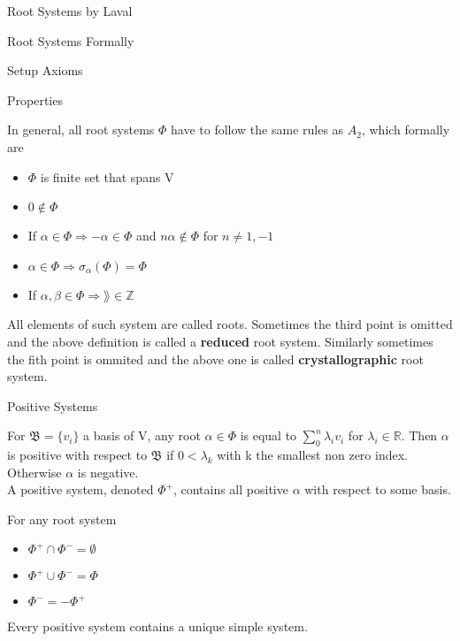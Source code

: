 \documentclass[12pt, letterpaper]{article}
\newcommand{\R}{\mathbb{R}}
\newcommand{\Z}{\mathbb{Z}}
\begin{document}
\begin{section}{Root Systems by Laval}
\begin{subsection}{Root Systems Formally}
\begin{subsubsection}{Setup Axioms}
    \end{subsubsection}

    \begin{subsubsection}{Properties}

      In general, all root systems \(\Phi\) have to follow the same rules as
      \(A_{2}\), which formally are
      \begin{itemize}
        \item \(\Phi\) is finite set that spans V
        \item \(0 \notin \Phi\)
        \item If \(\alpha \in \Phi \Rightarrow -\alpha \in \Phi\) and
              \(n \alpha \notin \Phi\) for \(n \neq 1,-1\)
        \item \(\alpha \in \Phi \Rightarrow \sigma_{\alpha}(\Phi) = \Phi\)
        \item If \(\alpha, \beta \in \Phi \Rightarrow \rang \in \Z\)
      \end{itemize}

      All elements of such system are called roots. Sometimes the third point
      is omitted and the above definition is called a \textbf{reduced} root
      system. Similarly sometimes the fith point is ommited and the above one
      is called \textbf{crystallographic} root system.

    \end{subsubsection}

    \begin{subsubsection}{Positive Systems}

      For \(\mathfrak{B} = \{v_{i}\}\) a basis of V, any root
      \(\alpha \in \Phi\) is equal to \(\sum^{n}_{0} \lambda_{i} v_{i}\) for
      \(\lambda_{i} \in \R\). Then \(\alpha\) is positive with respect to
      \(\mathfrak{B}\) if \(0 < \lambda_{k}\) with k the smallest non zero
      index. Otherwise \(\alpha\) is negative. \\
      A positive system, denoted \(\Phi^{+}\), contains all positive
      \(\alpha\) with respect to some basis.

      For any root system
      \begin{itemize}
        \item \(\Phi^{+} \cap \Phi^{-} = \emptyset\)
        \item \(\Phi^{+} \cup \Phi^{-} = \Phi\)
        \item \(\Phi^{-}  = -\Phi^{+}\)
      \end{itemize}

      Every positive system contains a unique simple system.


\end{subsubsection}
\end{subsection}
\end{section}
\end{document}
